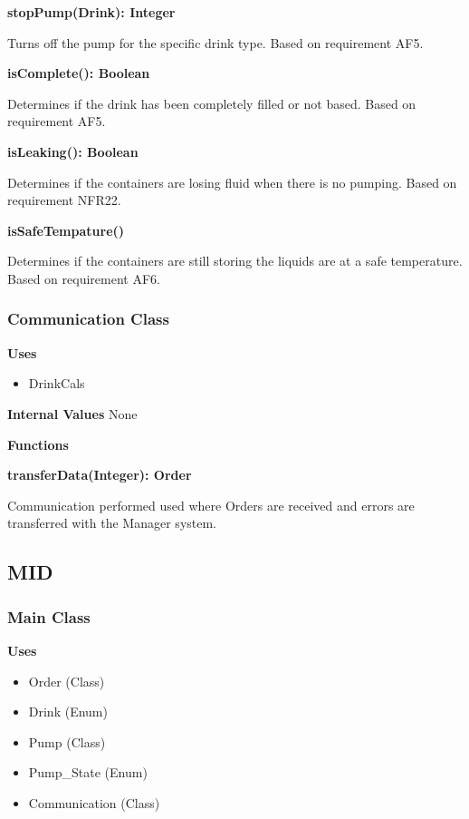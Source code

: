 \documentclass [10pt]{article}
\begin{document}
\textbf{stopPump(Drink): Integer}

Turns off the pump for the specific drink type. Based on requirement AF5.

\textbf{isComplete(): Boolean}

Determines if the drink has been completely filled or not based. Based on requirement AF5.


\textbf{isLeaking(): Boolean}

Determines if the containers are losing fluid when there is no pumping. Based on requirement NFR22.

\textbf{isSafeTempature()}

Determines if the containers are still storing the liquids are at a safe temperature. Based on requirement AF6.


\subsubsection{Communication Class}

\textbf{Uses}

\begin{itemize}
	\item DrinkCals
\end{itemize}

\textbf{Internal Values}
None

\textbf{Functions}

\textbf{transferData(Integer): Order}

Communication performed used  where Orders are received and errors are transferred with the Manager system.


\subsection{MID}


\subsubsection{Main Class}

\textbf{Uses}
\begin{itemize}
	\item Order (Class)
	\item Drink (Enum)
	\item Pump (Class)
	\item Pump\_State (Enum)
	\item Communication (Class)
\end{itemize}
\end{document}
